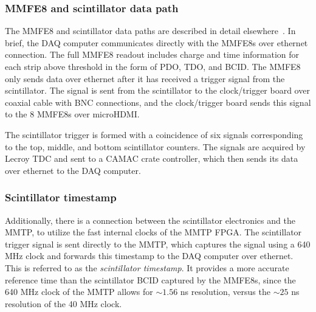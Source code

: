\subsubsection{MMFE8 and scintillator data path}
\label{sec:exp-mmfe}

The MMFE8 and scintillator data paths are described in detail elsewhere~\cite{noisy,noiseless}. In brief, the DAQ computer communicates directly with the MMFE8s over ethernet connection. The full MMFE8 readout includes charge and time information for each strip above threshold in the form of PDO, TDO, and BCID. The MMFE8 only sends data over ethernet after it has received a trigger signal from the scintillator. The signal is sent from the scintillator to the clock/trigger board over coaxial cable with BNC connections, and the clock/trigger board sends this signal to the 8 MMFE8s over microHDMI.

The scintillator trigger is formed with a coincidence of six signals corresponding to the top, middle, and bottom scintillator counters. The signals are acquired by Lecroy TDC and sent to a CAMAC crate controller, which then sends its data over ethernet to the DAQ computer.

\subsubsection{Scintillator timestamp}
\label{sec:exp-scitime}

Additionally, there is a connection between the scintillator electronics and the MMTP, to utilize the fast internal clocks of the MMTP FPGA. The scintillator trigger signal is sent directly to the MMTP, which captures the signal using a 640 MHz clock and forwards this timestamp to the DAQ computer over ethernet. This is referred to as the \textit{scintillator timestamp}. It provides a more accurate reference time than the scintillator BCID captured by the MMFE8s, since the 640 MHz clock of the MMTP allows for $\sim\!1.56$ ns resolution, versus the $\sim\!25$ ns resolution of the 40 MHz clock.

